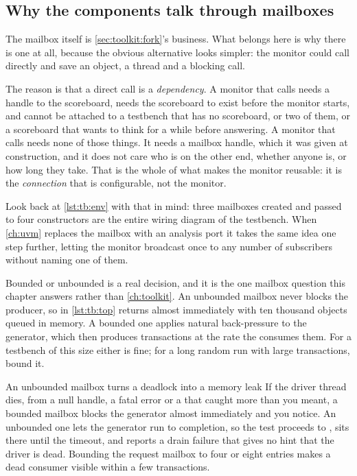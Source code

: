 \subsection{Why the components talk through mailboxes}

The mailbox itself is \cref{sec:toolkit:fork}'s business. What belongs
here is why there is one at all, because the obvious alternative looks
simpler: the monitor could call  directly and save an object,
a thread and a blocking call.

The reason is that a direct call is a \emph{dependency}. A monitor that calls
 needs a handle to the scoreboard, needs the scoreboard to
exist before the monitor starts, and cannot be attached to a testbench that has
no scoreboard, or two of them, or a scoreboard that wants to think for a while
before answering. A monitor that calls  needs none of
those things. It needs a mailbox handle, which it was given at construction,
and it does not care who is on the other end, whether anyone is, or how long
they take. That is the whole of what makes the monitor reusable: it is the
\emph{connection} that is configurable, not the monitor.

Look back at \cref{lst:tb:env} with that in mind: three mailboxes created and
passed to four constructors are the entire wiring diagram of the testbench.
When \cref{ch:uvm} replaces the mailbox with an analysis port it takes the same
idea one step further, letting the monitor broadcast once to any number of
subscribers without naming one of them.

Bounded or unbounded is a real decision, and it is the one mailbox question
this chapter answers rather than \cref{ch:toolkit}. An unbounded mailbox never
blocks the producer, so  in \cref{lst:tb:top} returns
almost immediately with ten thousand objects queued in memory. A bounded one
applies natural back-pressure to the generator, which then produces
transactions at the rate the \DUT{} consumes them. For a testbench of this size
either is fine; for a long random run with large transactions, bound it.

\begin{gotcha}{An unbounded mailbox turns a deadlock into a memory leak}
If the driver thread dies, from a null handle, a fatal error or a
 that caught more than you meant, a bounded mailbox blocks the
generator almost immediately and you notice. An unbounded one lets the
generator run to completion, so the test proceeds to , sits
there until the timeout, and reports a drain failure that gives no hint that
the driver is dead. Bounding the request mailbox to four or eight entries makes
a dead consumer visible within a few transactions.
\end{gotcha}

